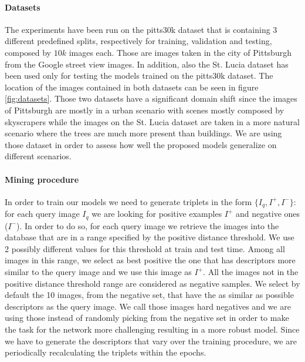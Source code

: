 \documentclass[10pt,twocolumn,letterpaper]{article}
\begin{document}
\paragraph{Datasets}
The experiments have been run on the pitts30k dataset \cite{NETVLAD} that is containing 3 different predefined splits, respectively for 
training, validation and testing, composed by $10k$ images each. Those are images taken in the city of Pittsburgh from the Google street
view images. In addition, also the St. Lucia dataset \cite{st_lucia} has been used only for testing the models trained on the pitts30k dataset.
The location of the images contained in both datasets can be seen in figure \ref{fig:datasets}. Those two datasets have a significant domain shift
since the images of Pittsburgh are mostly in a urban scenario with scenes mostly composed by skyscrapers while the images on the St. Lucia dataset 
are taken in a more natural scenario where the trees are much more present than buildings. We are using those dataset in order to assess how well
the proposed models generalize on different scenarios.

\paragraph{Mining procedure}\label{par:mining}
In order to train our models we need to generate triplets in the form $\{I_q, I^+, I^-\}$: for each query image $I_q$ we are looking for
positive examples $I^+$ and negative ones ($I^-$). In order to do so, for each query image we retrieve the images into the database that are
in a range specified by the positive distance threshold. We use 2 possibly different values for this threshold at train and test time.
Among all images in this range, we select as best positive the one that has descriptors more similar to the query image and we use this image
as $I^+$. All the images not in the positive distance threshold range are considered as negative samples. We select by default the 10 
images, from the negative set, that have the as similar as possible descriptors as the query image. We call those images hard negatives and
we are using those instead of randomly picking from the negative set in order to make the task for the network more challenging resulting in 
a more robust model. Since we have to generate the descriptors that vary over the training procedure, we are periodically recalculating the 
triplets within the epochs.
\end{document}
